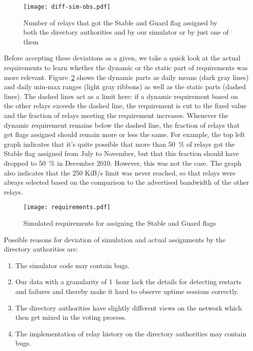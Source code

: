 \documentclass{article}
\begin{document}
\begin{figure}[t]
\texttt{[image: diff-sim-obs.pdf]}
\caption{Number of relays that got the Stable and Guard flag assigned by
both the directory authorities and by our simulator or by just one of
them}
\label{fig:diff-sim-obs}
\end{figure}

Before accepting these deviations as a given, we take a quick look at the
actual requirements to learn whether the dynamic or the static part of
requirements was more relevant.
Figure~\ref{fig:requirements} shows the dynamic parts as daily means (dark
gray lines) and daily min-max ranges (light gray ribbons) as well as the
static parts (dashed lines).
The dashed lines act as a limit here: if a dynamic requirement based on
the other relays exceeds the dashed line, the requirement is cut to the
fixed value and the fraction of relays meeting the requirement increases.
Whenever the dynamic requirement remains below the dashed line, the
fraction of relays that get flags assigned should remain more or less the
same.
For example, the top left graph indicates that it's quite possible that
more than 50~\% of relays got the Stable flag assigned from July
to November, but that this fraction should have dropped to 50~\% in
December 2010.
However, this was not the case.
The graph also indicates that the 250 KiB/s limit was never reached, so
that relays were always selected based on the comparison to the advertised
bandwidth of the other relays.

\begin{figure}
\texttt{[image: requirements.pdf]}
\caption{Simulated requirements for assigning the Stable and Guard flags}
\label{fig:requirements}
\end{figure}

Possible reasons for deviation of simulation and actual assignments by the
directory authorities are:

\begin{enumerate}
\item The simulator code may contain bugs.
\item Our data with a granularity of 1~hour lack the details for detecting
restarts and failures and thereby make it hard to observe uptime sessions
correctly.
\item The directory authorities have slightly different views on the
network which then get mixed in the voting process.
\item The implementation of relay history on the directory authorities may
contain bugs.
\end{enumerate}
\end{document}
